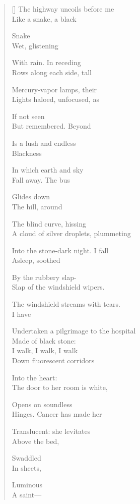 \settowidth{\versewidth}{To the black hills coiled by the roadside, the}
\begin{verse}[\versewidth]
The highway uncoils before me\\
Like a snake, a black

Snake\\
Wet, glistening

With rain.     In receding\\
Rows along each side, tall

Mercury-vapor lamps, their\\
Lights haloed, unfocused, as

If not seen\\
But remembered.     Beyond

Is a lush and endless\\
Blackness

In which earth and sky\\
Fall away.     The bus

Glides down\\
The hill, around

The blind curve, hissing\\
A cloud of silver droplets, plummeting

Into the stone-dark night.     I fall\\
Asleep, soothed

By the rubbery slap-\\
Slap of the windshield wipers.

The windshield streams with tears.\\
I have

Undertaken a pilgrimage to the hospital\\
Made of black stone:\\

I walk, I walk, I walk\\
Down fluorescent corridors

Into the heart:\\
The door to her room is white,

Opens on soundless\\
Hinges.     Cancer has made her

Translucent: she levitates\\
Above the bed,

Swaddled\\
In sheets,

Luminous\\
A saint---


\end{verse}
